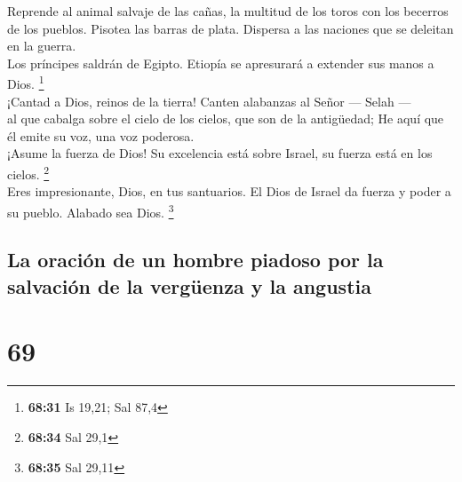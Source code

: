  Reprende al animal salvaje de las cañas, la multitud de
los toros con los becerros de los pueblos. Pisotea las barras de plata.
Dispersa a las naciones que se deleitan en la guerra.\\
 Los príncipes saldrán de Egipto. Etiopía se apresurará a
extender sus manos a Dios. \footnote{\textbf{68:31} Is 19,21; Sal 87,4}\\
 ¡Cantad a Dios, reinos de la tierra! Canten alabanzas al
Señor --- Selah ---\\
 al que cabalga sobre el cielo de los cielos, que son de
la antigüedad; He aquí que él emite su voz, una voz poderosa.\\
 ¡Asume la fuerza de Dios! Su excelencia está sobre
Israel, su fuerza está en los cielos. \footnote{\textbf{68:34} Sal 29,1}\\
 Eres impresionante, Dios, en tus santuarios. El Dios de
Israel da fuerza y poder a su pueblo. Alabado sea Dios. \footnote{\textbf{68:35}
  Sal 29,11}

\hypertarget{la-oraciuxf3n-de-un-hombre-piadoso-por-la-salvaciuxf3n-de-la-verguxfcenza-y-la-angustia}{%
\subsection{La oración de un hombre piadoso por la salvación de la
vergüenza y la
angustia}\label{la-oraciuxf3n-de-un-hombre-piadoso-por-la-salvaciuxf3n-de-la-verguxfcenza-y-la-angustia}}

\hypertarget{section-67}{%
\section{69}\label{section-67}}

